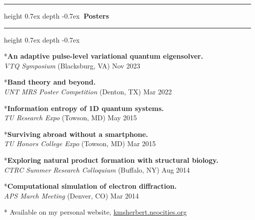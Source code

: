 \documentclass[marginmode, 10pt]{res} %
\def\Vhrulefill{\leavevmode\leaders\hrule height 0.7ex depth \dimexpr0.4pt-0.7ex\hfill\kern0pt}         %
\begin{document}
\begin{resume}
\Vhrulefill \textbf{~Posters~} \Vhrulefill


*\textbf{An adaptive pulse-level variational quantum eigensolver.} \\
    \textit{VTQ Symposium} (Blacksburg, VA) \hfill Nov 2023

*\textbf{Band theory and beyond.} \\
    \textit{UNT MRS Poster Competition} (Denton, TX) \hfill Mar 2022

*\textbf{Information entropy of 1D quantum systems.} \\
    \textit{TU Research Expo} (Towson, MD) \hfill May 2015

*\textbf{Surviving abroad without a smartphone.} \\
    \textit{TU Honors College Expo} (Towson, MD) \hfill Mar 2015

*\textbf{Exploring natural product formation with structural biology.} \\
    \textit{CTRC Summer Research Colloquium} (Buffalo, NY) \hfill Aug 2014

*\textbf{Computational simulation of electron diffraction.} \\
    \textit{APS March Meeting} (Denver, CO) \hfill Mar 2014

* Available on my personal website, \href{kmsherbert.neocities.org}{kmsherbert.neocities.org}


\end{resume}
\end{document}
